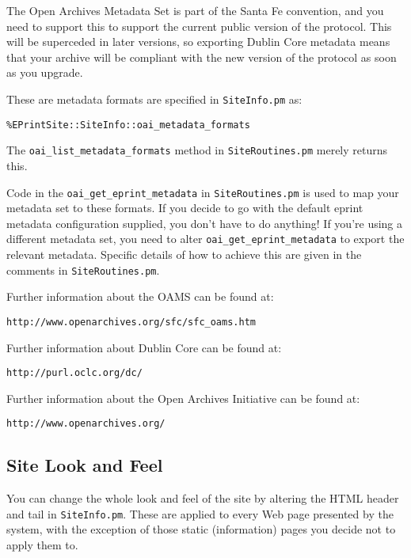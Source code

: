 The Open Archives Metadata Set is part of the Santa Fe convention, and you need to support this to support the current public version of the protocol. This will be superceded in later versions, so exporting Dublin Core metadata means that your archive will be compliant with the new version of the protocol as soon as you upgrade.

These are metadata formats are specified in {\tt SiteInfo.pm} as:

\begin{verbatim}
%EPrintSite::SiteInfo::oai_metadata_formats
\end{verbatim}

The {\tt oai\_list\_metadata\_formats} method in {\tt SiteRoutines.pm} merely returns this.

Code in the {\tt oai\_get\_eprint\_metadata} in {\tt SiteRoutines.pm} is used to map your metadata set to these formats. If you decide to go with the default eprint metadata configuration supplied, you don't have to do anything! If you're using a different metadata set, you need to alter {\tt oai\_get\_eprint\_metadata} to export the relevant metadata. Specific details of how to achieve this are given in the comments in {\tt SiteRoutines.pm}.

Further information about the OAMS can be found at:

\begin{verbatim}
http://www.openarchives.org/sfc/sfc_oams.htm
\end{verbatim}

Further information about Dublin Core can be found at:

\begin{verbatim}
http://purl.oclc.org/dc/
\end{verbatim}

Further information about the Open Archives Initiative can be found at:

\begin{verbatim}
http://www.openarchives.org/
\end{verbatim}


\subsection{Site Look and Feel}
\label{install_laf}

You can change the whole look and feel of the site by altering the HTML header and tail in {\tt SiteInfo.pm}. These are applied to every Web page presented by the system, with the exception of those static (information) pages you decide not to apply them to.

